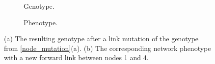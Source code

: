 \begin{figure}[htb]
    \begin{mdframed}
        \begin{subfigure}[b]{0.45\textwidth}
            \centering
            \resizebox{1\textwidth}{!}{}
            \caption{Genotype.}
            \label{link_genotype}
        \end{subfigure}
        \begin{subfigure}[b]{0.45\textwidth}
            \centering
            \resizebox{0.65\textwidth}{!}{}
            \caption{Phenotype.}
            \label{link_phenotype}
        \end{subfigure}
    \end{mdframed}
    \caption{ (a) The resulting genotype after a link mutation of the genotype from \ref{node_mutation}(a). (b) The
    corresponding network phenotype with a new forward link between nodes 1 and 4.}
    \label{link_mutation}
\end{figure}
